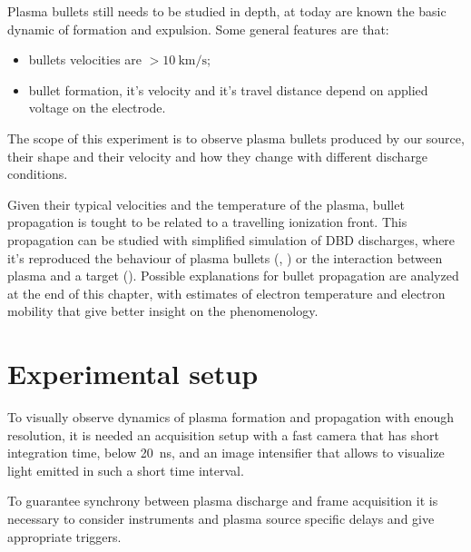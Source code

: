 Plasma bullets still needs to be studied in depth, at today are known the basic dynamic of formation and expulsion. Some general features are that:
\begin{itemize}
 \item bullets velocities are $> \SI{10}{\kilo\meter/\second}$;
 \item bullet formation, it's velocity and it's travel distance depend on applied voltage on the electrode.
\end{itemize}

The scope of this experiment is to observe plasma bullets produced by our source, their shape and their velocity and how they change with different discharge conditions.

Given their typical velocities and the temperature of the plasma, bullet propagation is tought to be related to a travelling ionization front. This propagation can be studied with simplified simulation of DBD discharges, where it's reproduced the behaviour of plasma bullets (\cite{doi:10.1063/1.4963115}, \cite{Breden_2012}) or the interaction between plasma and a target (\cite{doi:10.1063/1.4923345}). Possible explanations for bullet propagation are analyzed at the end of this chapter, with estimates of electron temperature and electron mobility that give better insight on the phenomenology.

\section{Experimental setup}
To visually observe dynamics of plasma formation and propagation with enough resolution, it is needed an acquisition setup with a fast camera that has short integration time, below \SI{20}{\nano\second}, and an image intensifier that allows to visualize light emitted in such a short time interval.

To guarantee synchrony between plasma discharge and frame acquisition it is necessary to consider instruments and plasma source specific delays and give appropriate triggers.

